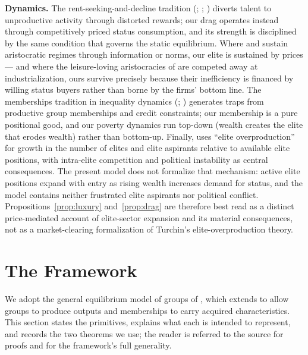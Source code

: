 \documentclass[12pt,letterpaper]{article}
\theoremstyle{definition}
\begin{document}
\textbf{Dynamics.}
The rent-seeking-and-decline tradition (\citealt{murphyshleifervishny1991}; \citealt{baumol1990entrepreneurship}; \citealt{acemoglu1995reward}) diverts talent to unproductive activity through distorted rewards; our drag operates instead through competitively priced status consumption, and its strength is disciplined by the same condition that governs the static equilibrium.
Where \citet{hasslermora2000} and \citet{colemailathpostlewaite1992} sustain aristocratic regimes through information or norms, our elite is sustained by prices --- and where the leisure-loving aristocracies of \citet{doepkezilibotti2008} are competed away at industrialization, ours survive precisely because their inefficiency is financed by willing status buyers rather than borne by the firms' bottom line.
The memberships tradition in inequality dynamics (\citealt{durlauf1996persistent}; \citealt{galorzeira1993}) generates traps from productive group memberships and credit constraints; our membership is a pure positional good, and our poverty dynamics run top-down (wealth creates the elite that erodes wealth) rather than bottom-up.
Finally, \citet{turchin2023endtimes} uses ``elite overproduction'' for growth in the number of elites and elite aspirants relative to available elite positions, with intra-elite competition and political instability as central consequences.
The present model does not formalize that mechanism: active elite positions expand with entry as rising wealth increases demand for status, and the model contains neither frustrated elite aspirants nor political conflict.
Propositions~\ref{prop:luxury} and~\ref{prop:drag} are therefore best read as a distinct price-mediated account of elite-sector expansion and its material consequences, not as a market-clearing formalization of Turchin's elite-overproduction theory.

\section{The Framework}\label{sec:framework}

We adopt the general equilibrium model of groups of \citet{ellickson2006organization}, which extends \citet{ellickson1999clubs} to allow groups to produce outputs and memberships to carry acquired characteristics.
This section states the primitives, explains what each is intended to represent, and records the two theorems we use; the reader is referred to the source for proofs and for the framework's full generality.
\end{document}
